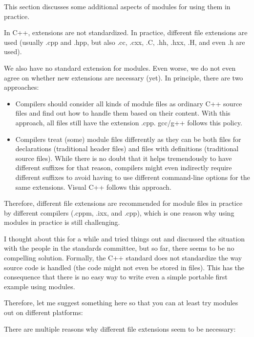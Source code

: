

This section discusses some additional aspects of modules for using them in practice.



In C++, extensions are not standardized. In practice, different file extensions are used (usually .cpp and .hpp, but also .cc, .cxx, .C, .hh, .hxx, .H, and even .h are used).

We also have no standard extension for modules. Even worse, we do not even agree on whether new extensions are necessary (yet). In principle, there are two approaches:

\begin{itemize}
\item 
Compilers should consider all kinds of module files as ordinary C++ source files and find out how to handle them based on their content. With this approach, all files still have the extension .cpp. gcc/g++ follows this policy.
 
\item 
Compilers treat (some) module files differently as they can be both files for declarations (traditional header files) and files with definitions (traditional source files). While there is no doubt that it helps tremendously to have different suffixes for that reason, compilers might even indirectly require different suffixes to avoid having to use different command-line options for the same extensions. Visual C++ follows this approach.
\end{itemize}

Therefore, different file extensions are recommended for module files in practice by different compilers (.cppm, .ixx, and .cpp), which is one reason why using modules in practice is still challenging.

I thought about this for a while and tried things out and discussed the situation with the people in the standards committee, but so far, there seems to be no compelling solution. Formally, the C++ standard does not standardize the way source code is handled (the code might not even be stored in files). This has the consequence that there is no easy way to write even a simple portable first example using modules.

Therefore, let me suggest something here so that you can at least try modules out on different platforms: 

There are multiple reasons why different file extensions seem to be necessary:


